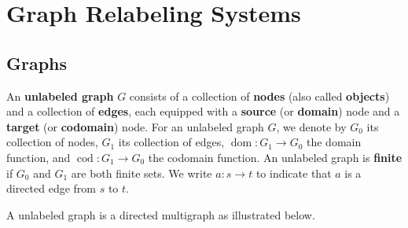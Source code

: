 
\chapter{Graph Relabeling Systems}
    \label{sec:gls}
    \section{Graphs}
    \label{sec:graphs}
    \begin{definition}
        \label{def:graph:unlabeled}
        An \textbf{unlabeled graph} \( G \) consists of a collection of \textbf{nodes} (also called \textbf{objects}) and a collection of \textbf{edges}, each equipped with a \textbf{source} (or \textbf{domain}) node and a \textbf{target} (or \textbf{codomain}) node. 
        For an unlabeled graph \( G \), we denote by \( G_0 \) its collection of nodes, \( G_1 \) its collection of edges, \( \operatorname{dom}:G_1{\to}G_0 \) the domain function, and \( \operatorname{cod}:G_1{\to}G_0 \) the codomain function. An unlabeled graph is \textbf{finite} if \( G_0 \) and \( G_1 \) are both finite sets.
        We write \( a: s \to t \) to indicate that \( a \) is a directed edge from \( s \) to \( t \). 
    \end{definition}   
    \begin{example}
      A unlabeled graph is a directed multigraph as illustrated below.
       
        \begin{center}
      \end{center} 
    \end{example}
